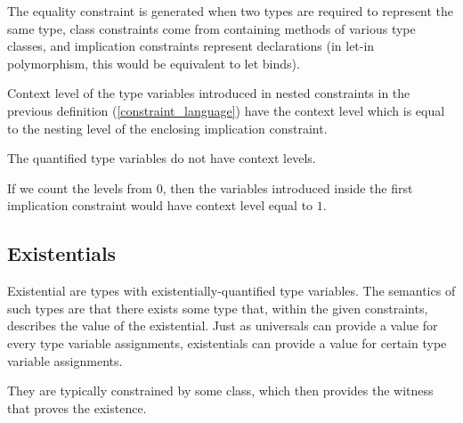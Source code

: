 The equality constraint is generated when two types are required to represent the same type, class constraints come from containing methods of various type classes, and implication constraints represent declarations (in let-in polymorphism, this would be equivalent to let binds).

\begin{defn}
    Context level of the type variables introduced in nested constraints in the previous definition (\ref{constraint_language}) have the context level which is equal to the nesting level of the enclosing implication constraint. 

    The quantified type variables do not have context levels.
\end{defn}

\begin{ex}
    If we count the levels from $0$, then the variables introduced inside the first implication constraint would have context level equal to $1$.
\end{ex}

\subsection{Existentials}

Existential are types with existentially-quantified type variables. The semantics of such types are that there exists some type that, within the given constraints, describes the value of the existential. Just as universals can provide a value for every type variable assignments, existentials can provide a value for certain type variable assignments.

They are typically constrained by some class, which then provides the witness that proves the existence.

